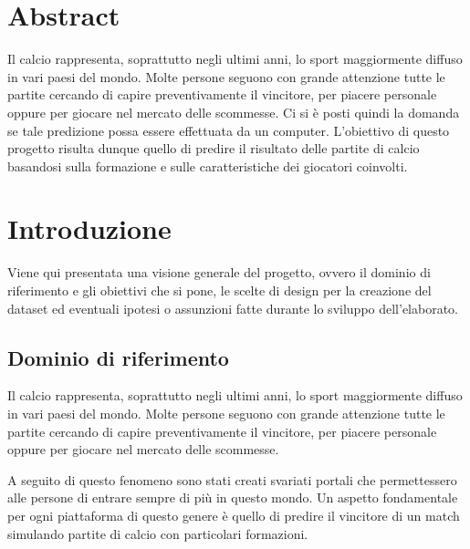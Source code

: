 \documentclass[hidelinks, 12pt]{article}
\begin{document}
	
	\tableofcontents
	\pagebreak
	
	
	
	
	\section{Abstract}
	
	Il calcio rappresenta, soprattutto negli ultimi anni, lo sport maggiormente diffuso in vari paesi del mondo. Molte persone seguono con grande attenzione tutte le partite cercando di capire preventivamente il vincitore, per piacere personale oppure per giocare nel mercato delle scommesse. Ci si è posti quindi la domanda se tale predizione possa essere effettuata da un computer. L'obiettivo di questo progetto risulta dunque quello di predire il risultato delle partite di calcio basandosi sulla formazione e sulle caratteristiche dei giocatori coinvolti.
	
	
	
	
	\section{Introduzione}
	
	Viene qui presentata una visione generale del progetto, ovvero il dominio di riferimento e gli obiettivi che si pone, le scelte di design per la creazione del dataset ed eventuali ipotesi o assunzioni fatte durante lo sviluppo dell'elaborato.
	
	
	
	\subsection{Dominio di riferimento}
	
	Il calcio rappresenta, soprattutto negli ultimi anni, lo sport maggiormente diffuso in vari paesi del mondo. Molte persone seguono con grande attenzione tutte le partite cercando di capire preventivamente il vincitore, per piacere personale oppure per giocare nel mercato delle scommesse.
	
	A seguito di questo fenomeno sono stati creati svariati portali che permettessero alle persone di entrare sempre di più in questo mondo. Un aspetto fondamentale per ogni piattaforma di questo genere è quello di predire il vincitore di un match simulando partite di calcio con particolari formazioni.
	
\end{document}
